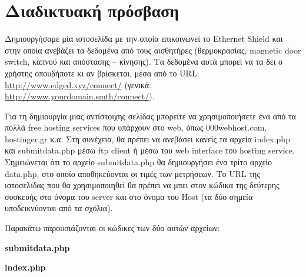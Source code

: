 \documentclass[twoside,a4paper]{article}
\begin{document}
\section{Διαδικτυακή πρόσβαση}
\begin{flushleft}
\par Δημιουργήσαμε μία ιστοσελίδα με την οποία επικοινωνεί το Ethernet Shield και στην οποία ανεβάζει τα δεδομένα από τους αισθητήρες (θερμοκρασίας, magnetic door switch, καπνού και απόστασης – κίνησης). Τα δεδομένα αυτά μπορεί να τα δει ο χρήστης οπουδήποτε κι αν βρίσκεται, μέσα από το URL: \url{http://www.edged.xyz/connect/} (γενικά: \url{http://www.yourdomain.smth/connect/}).
\par Για τη δημιουργία μιας αντίστοιχης σελίδας μπορείτε να χρησιμοποιήσετε ένα από τα πολλά free hosting services που υπάρχουν στο web, όπως 000webhost.com, hostinger.gr κ.α. Στη συνέχεια, θα πρέπει να ανεβάσει κανείς τα αρχεία index.php και submitdata.php μέσω ftp client ή μέσω του web interface του hosting service. Σημειώνεται ότι το αρχείο submitdata.php θα δημιουργήσει ένα τρίτο αρχείο data.php, στο οποίο αποθηκεύονται οι τιμές των μετρήσεων. Tο URL της ιστοσελίδας που θα χρησιμοποιηθεί θα πρέπει να μπει στον κώδικα της δεύτερης συσκευής στο όνομα του server και στο όνομα του Host (τα δύο σημεία υποδεικνύονται από τα σχόλια).  
\par Παρακάτω παρουσιάζονται οι κώδικες των δύο αυτών αρχείων: 
\end{flushleft}
\begin{center} 
\textbf{submitdata.php} \end{center}


\newpage
\begin{center} 
\textbf{index.php} \end{center}

\end{document}
